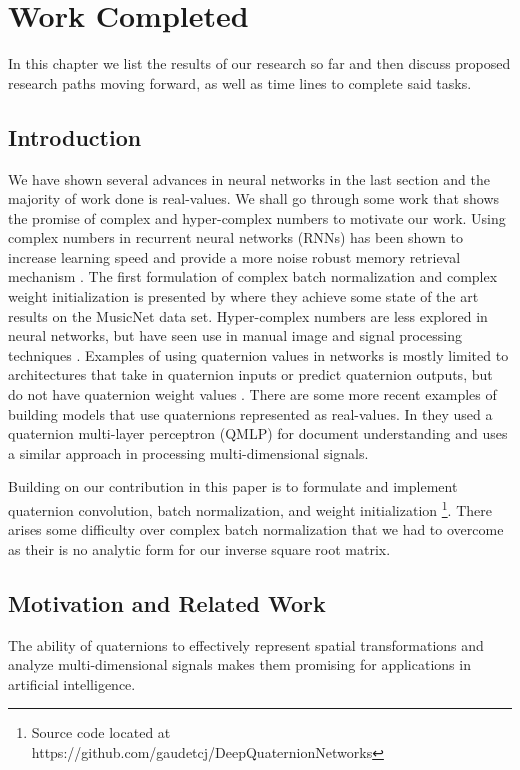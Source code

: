 \chapter{Work Completed}
In this chapter we list the results of our research so far and then discuss proposed research paths moving forward, as well as time lines to complete said tasks.

\section{Introduction}
We have shown several advances in neural networks in the last section and the majority of work done is real-values.
We shall go through some work that shows the promise of complex and hyper-complex numbers to motivate our work.
Using complex numbers in recurrent neural networks (RNNs) has been shown to increase learning speed and provide a more noise robust memory retrieval mechanism \cite{arjovsky2016unitary, danihelka2016associative, wisdom2016full}.
The first formulation of complex batch normalization and complex weight initialization is presented by \cite{trabelsi2017deep} where they achieve some state of the art results on the MusicNet data set.
Hyper-complex numbers are less explored in neural networks, but have seen use in manual image and signal processing techniques \cite{bulow1999hypercomplex, sangwine2000colour, bulow2001hypercomplex}.
Examples of using quaternion values in networks is mostly limited to architectures that take in quaternion inputs or predict quaternion outputs, but do not have quaternion weight values \cite{rishiyur2006neural, kendall2015posenet}. 
There are some more recent examples of building models that use quaternions represented as real-values. 
In \cite{parcollet2016quaternion} they used a quaternion multi-layer perceptron (QMLP) for document understanding and \cite{minemoto2017feed} uses a similar approach in processing multi-dimensional signals. 

Building on \cite{trabelsi2017deep} our contribution in this paper is to formulate and implement quaternion convolution, batch normalization, and weight initialization \footnote{Source code located at https://github.com/gaudetcj/DeepQuaternionNetworks}.
There arises some difficulty over complex batch normalization that we had to overcome as their is no analytic form for our inverse square root matrix.

\section{Motivation and Related Work}
The ability of quaternions to effectively represent spatial transformations and analyze multi-dimensional signals makes them promising for applications in artificial intelligence.

